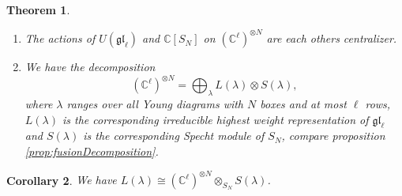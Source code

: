 \documentclass[11pt]{report}
\newtheorem{theorem}{Theorem}[section]
\newtheorem{corollary}[theorem]{Corollary}
\theoremstyle{definition}
\theoremstyle{remark}
\theoremstyle{remark}
\newcommand{\C}{\mathbb{C}}
\begin{document}
\begin{theorem}
\begin{enumerate}[label=(\roman*)]
\item The actions of $U(\mathfrak{gl}_\ell)$ and $\C[S_N]$ on $(\C^\ell)^{\otimes N}$ are each others centralizer.
\item We have the decomposition
\begin{equation*}
(\C^\ell)^{\otimes N} = \bigoplus_{\lambda} L(\lambda) \otimes S(\lambda),
\end{equation*}
where $\lambda$ ranges over all Young diagrams with $N$ boxes and at most $\ell$ rows, $L(\lambda)$ is the corresponding irreducible highest weight representation of $\mathfrak{gl}_\ell$ and $S(\lambda)$ is the corresponding Specht module of $S_N$, compare proposition \ref{prop:fusionDecomposition}.
\end{enumerate}
\end{theorem}

\begin{corollary}
We have $L(\lambda) \cong (\C^\ell)^{\otimes N} \otimes_{S_N} S(\lambda)$.
\end{corollary}
\end{document}
